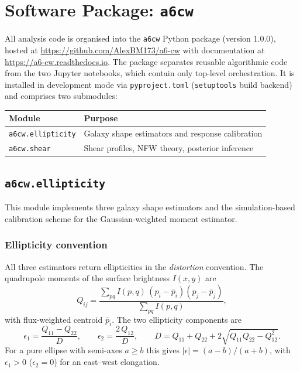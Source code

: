 
\appendix

\section{Software Package: \texttt{a6cw}}
\label{app:package}

All analysis code is organised into the \texttt{a6cw} Python package (version
1.0.0), hosted at \url{https://github.com/AlexBM173/a6-cw} with documentation
at \url{https://a6-cw.readthedocs.io}. The package separates reusable
algorithmic code from the two Jupyter notebooks, which contain only top-level
orchestration. It is installed in development mode via \texttt{pyproject.toml}
(\texttt{setuptools} build backend) and comprises two submodules:

\begin{center}
\begin{tabular}{ll}
\hline
\textbf{Module} & \textbf{Purpose} \\
\hline
\texttt{a6cw.ellipticity} & Galaxy shape estimators and response calibration \\
\texttt{a6cw.shear}       & Shear profiles, NFW theory, posterior inference \\
\hline
\end{tabular}
\end{center}

\subsection{\texttt{a6cw.ellipticity}}
\label{app:ellipticity}

This module implements three galaxy shape estimators and the
simulation-based calibration scheme for the Gaussian-weighted moment
estimator.

\subsubsection*{Ellipticity convention}

All three estimators return ellipticities in the \emph{distortion} convention.
The quadrupole moments of the surface brightness $I(x,y)$ are
\begin{equation}
    Q_{ij} = \frac{\sum_{pq} I(p,q)\,(p_i - \bar{p}_i)(p_j - \bar{p}_j)}
                  {\sum_{pq} I(p,q)},
\end{equation}
with flux-weighted centroid $\bar{p}_i$. The two ellipticity components are
\begin{equation}
    \epsilon_1 = \frac{Q_{11} - Q_{22}}{D}, \qquad
    \epsilon_2 = \frac{2\,Q_{12}}{D}, \qquad
    D = Q_{11} + Q_{22} + 2\sqrt{Q_{11}Q_{22} - Q_{12}^2}.
\end{equation}
For a pure ellipse with semi-axes $a \ge b$ this gives $|\epsilon| = (a-b)/(a+b)$,
with $\epsilon_1 > 0$ ($\epsilon_2 = 0$) for an east--west elongation.

